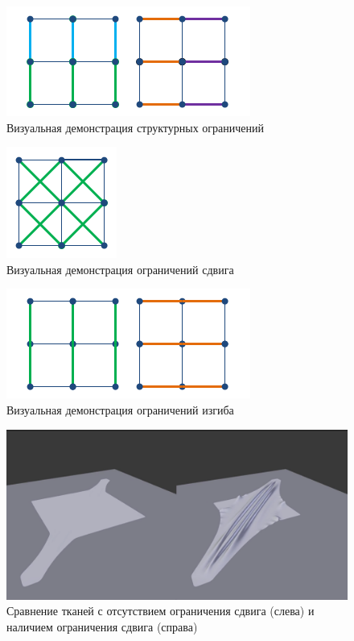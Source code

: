 	\begin{figure}[ht!] 
		\center
		\includegraphics [scale=0.5] {my_folder/images//structural}
		\caption{Визуальная демонстрация структурных ограничений}
		\label{fig:structural}  
	\end{figure}
	
	\begin{figure}[ht!] 
		\center
		\includegraphics [scale=0.5] {my_folder/images//shear}
		\caption{Визуальная демонстрация ограничений сдвига}
		\label{fig:shear}  
	\end{figure}
	
	\begin{figure}[ht!] 
		\center
		\includegraphics [scale=0.5] {my_folder/images//bending}
		\caption{Визуальная демонстрация ограничений изгиба}
		\label{fig:bending}  
	\end{figure}
	
	\begin{figure}[ht!] 
		\center
		\includegraphics [scale=0.2] {my_folder/images//shear_blender}
		\caption{Сравнение тканей с отсутствием ограничения сдвига (слева) и наличием ограничения сдвига (справа)}
		\label{fig:shear_blender}  
	\end{figure}

